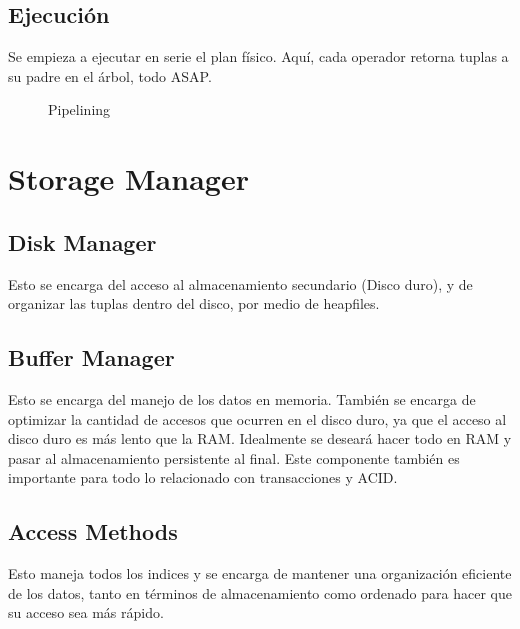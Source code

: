 \subsection{Ejecución}
Se empieza a ejecutar en serie el plan físico. Aquí, cada operador retorna tuplas a su padre en el árbol, todo ASAP.

\begin{figure}[h]
  \centering
  \caption{Pipelining}
\end{figure}

\section{Storage Manager}
\subsection{Disk Manager}
Esto se encarga del acceso al almacenamiento secundario (Disco duro), y de organizar las tuplas dentro del disco, por medio de heapfiles.

\subsection{Buffer Manager}
Esto se encarga del manejo de los datos en memoria. También se encarga de optimizar la cantidad de accesos que ocurren en el disco duro, ya que el acceso al disco duro es más lento que la RAM. Idealmente se deseará hacer todo en RAM y pasar al almacenamiento persistente al final. Este componente también es importante para todo lo relacionado con transacciones y ACID.

\subsection{Access Methods}
Esto maneja todos los indices y se encarga de mantener una organización eficiente de los datos, tanto en términos de almacenamiento como ordenado para hacer que su acceso sea más rápido.


